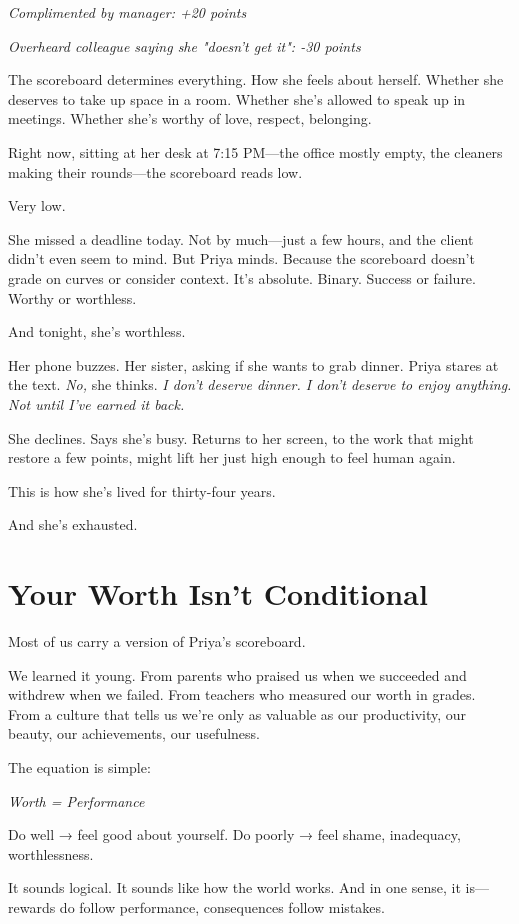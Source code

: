 \documentclass[11pt,twoside]{book}
\begin{document}
\emph{Complimented by manager: +20 points}

\emph{Overheard colleague saying she "doesn't get it": -30 points}

The scoreboard determines everything. How she feels about herself. Whether she deserves to take up space in a room. Whether she's allowed to speak up in meetings. Whether she's worthy of love, respect, belonging.

Right now, sitting at her desk at 7:15 PM—the office mostly empty, the cleaners making their rounds—the scoreboard reads low.

Very low.

She missed a deadline today. Not by much—just a few hours, and the client didn't even seem to mind. But Priya minds. Because the scoreboard doesn't grade on curves or consider context. It's absolute. Binary. Success or failure. Worthy or worthless.

And tonight, she's worthless.

Her phone buzzes. Her sister, asking if she wants to grab dinner. Priya stares at the text. \emph{No,} she thinks. \emph{I don't deserve dinner. I don't deserve to enjoy anything. Not until I've earned it back.}

She declines. Says she's busy. Returns to her screen, to the work that might restore a few points, might lift her just high enough to feel human again.

This is how she's lived for thirty-four years.

And she's exhausted.

\section*{Your Worth Isn't Conditional}

Most of us carry a version of Priya's scoreboard.

We learned it young. From parents who praised us when we succeeded and withdrew when we failed. From teachers who measured our worth in grades. From a culture that tells us we're only as valuable as our productivity, our beauty, our achievements, our usefulness.

The equation is simple:

\emph{Worth = Performance}

Do well → feel good about yourself.
Do poorly → feel shame, inadequacy, worthlessness.

It sounds logical. It sounds like how the world works. And in one sense, it is—rewards do follow performance, consequences follow mistakes.
\end{document}

